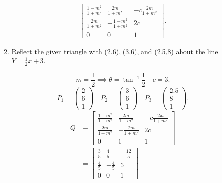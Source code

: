 \documentclass{zc-ust-hw}
\begin{document}
\begin{enumerate}
\begin{enumerate}
\begin{sol}
\begin{align}
\begin{bmatrix}
                \frac{1-m^2}{1+m^2} & \frac{2m}{1+m^2} & -c\frac{2m}{1+m^2} \\
                \frac{2m}{1+m^2} & -\frac{1-m^2}{1+m^2} & 2c \\
                0 & 0 & 1
              \end{bmatrix}
            .\end{align}
        \end{sol}
      \item Reflect the given triangle with (2,6), (3,6), and (2.5,8) about the line $Y=\frac{1}{2}x+3$.
        \begin{sol}
          \begin{equation}
            m = \frac{1}{2} \implies \theta = \tan^{-1}\frac{1}{2} \quad c=3
          .\end{equation}
          \begin{equation}
            P_1 = \begin{pmatrix} 2\\6\\1 \end{pmatrix} \quad P_2 = \begin{pmatrix} 3\\6\\1 \end{pmatrix} \quad P_3 = \begin{pmatrix} 2.5\\8\\1 \end{pmatrix}
          .\end{equation}
          \begin{align}
              Q &= \begin{bmatrix} 
                \frac{1-m^2}{1+m^2} & \frac{2m}{1+m^2} & -c\frac{2m}{1+m^2} \\
                \frac{2m}{1+m^2} & -\frac{2m}{1+m^2} & 2c \\
                0 & 0 & 1
              \end{bmatrix} \\
            &= \begin{bmatrix} 
                \frac{3}{5} & \frac{4}{5} & -\frac{12}{5} \\
                \frac{4}{5} & -\frac{4}{5} & 6 \\
                0 & 0 & 1
              \end{bmatrix}
          .\end{align}
          \begin{align}

\end{align}
\end{sol}
\end{enumerate}
\end{enumerate}
\end{document}
